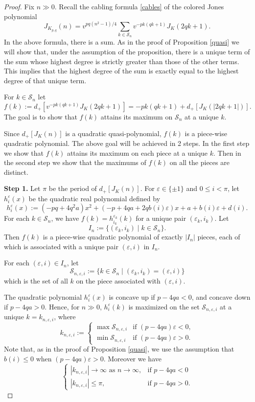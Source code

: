 \documentclass[11pt]{amsart}
\theoremstyle{definition}
\def\CS{\mathcal S}
\def\ve{\varepsilon}
\begin{document}
\begin{proof} Fix $n \gg 0$. Recall the cabling formula \eqref{cables} of the colored Jones polynomial
$$J_{K_{p,q}}(n)= v^{pq(n^2-1)/4} \sum_{k \in \CS_n} v^{-pk(qk+1)} J_K(2qk+1).$$
In the above formula, there is a sum. As in the proof of Proposition \ref{quasi} we will show that, under the assumption of the proposition, there is a unique term of the sum whose highest degree is strictly greater than those of the other terms. This implies that the highest degree of the sum is exactly equal to the highest degree of that unique term. 

For $k \in \CS_n$ let $$f(k) := d_+ [v^{-pk(qk+1)} J_K(2qk+1)] = -pk(qk+1)+d_+[J_K(|2qk+1|)].$$
The goal is to show that $f(k)$ attains its maximum on $\CS_n$ at a unique $k$. 

Since $d_+[J_K(n)]$ is a quadratic quasi-polynomial, $f(k)$ is a piece-wise quadratic polynomial. The above goal will be achieved in 2 steps. In the first step we show that $f(k)$ attains its maximum on each piece at a unique $k$. Then in the second step we show that the maximums of $f(k)$ on all the pieces are distinct.
\smallskip

\textbf{Step 1.} Let $\pi$ be the period of $d_+[J_K(n)]$. For $\ve \in \{\pm 1\}$ and $0 \le i < \pi$, let $h_i^{\ve}(x)$ be the quadratic real polynomial defined by
$$
h_i^{\ve}(x) := ( -pq + 4q^2 a ) x^2 + ( -p + 4q a + 2q b(i) \ve ) x +  a + b(i) \ve + d(i).
$$
For each $k \in \CS_n$, we have $f(k)= h^{\ve_k}_{i_k}(k)$
for a unique pair $(\ve_k, i_{k})$. Let
$$I_n := \{ (\ve_k,i_{k}) \mid k \in \CS_n\}.$$
Then $f(k)$ is a piece-wise quadratic polynomial of exactly $|I_n|$ pieces, each of which is associated with a unique pair $(\ve, i)$ in $I_n$.

For each $(\ve,i) \in I_n$, let $$\CS_{n,\ve,i} := \{ k \in \CS_n \mid (\ve_k, i_k) = (\ve,i)\}$$
which is the set of all $k$ on the piece associated with $(\ve,i)$. 

The quadratic polynomial $h_i^{\ve}(x)$ is concave up if $p-4qa<0$, and concave down if $p-4qa>0$.  Hence, for $n \gg 0$, $h_i^{\ve}(k)$ is maximized on the set $\CS_{n,\ve,i}$ at a unique $k=k_{n,\ve,i}$, where
$$ k_{n,\ve,i} := \begin{cases} \max \CS_{n,\ve,i} &\mbox{if } (p - 4qa)\ve < 0, \\
\min \CS_{n,\ve,i} &\mbox{if } (p - 4qa)\ve > 0.  \end{cases}$$
Note that, as in the proof of Proposition \ref{quasi}, we use the assumption that $b(i) \le 0$ when $(p - 4qa)\ve > 0$. Moreover we have 
$$ \begin{cases}  |k_{n,\ve,i}|  \to \infty \mbox{ as }  n \to \infty, &\mbox{if } p - 4qa < 0 \\
 |k_{n,\ve,i}|  \le \pi, &\mbox{if } p - 4qa > 0.  \end{cases}$$
\smallskip


\end{proof}
\end{document}
